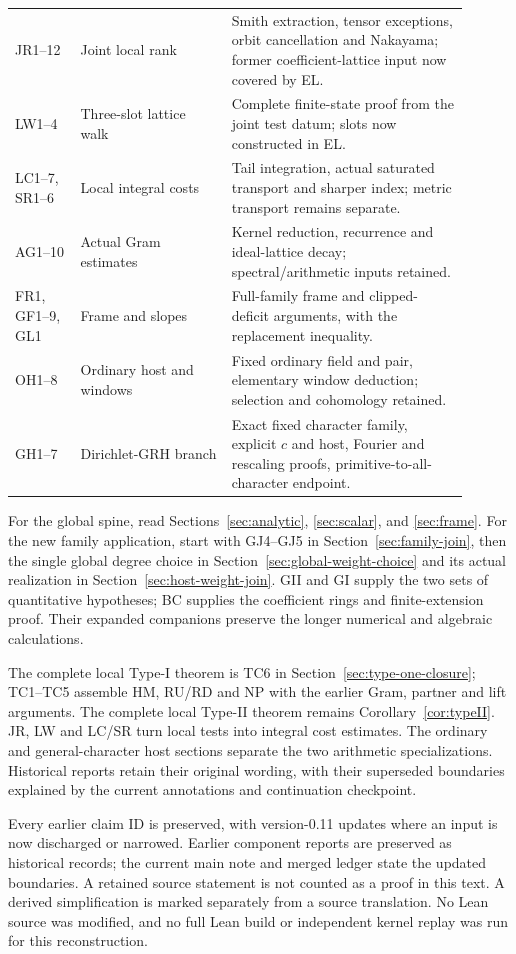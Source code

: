 \documentclass[11pt,a4paper]{article}
\numberwithin{equation}{section}
\theoremstyle{remark}\newtheorem{remark}[theorem]{Remark}
\begin{document}
\begin{longtable}{>{\raggedright\arraybackslash}p{0.13\linewidth}>{\raggedright\arraybackslash}p{0.30\linewidth}>{\raggedright\arraybackslash}p{0.47\linewidth}}
JR1--12 & Joint local rank & Smith extraction, tensor exceptions, orbit cancellation and Nakayama; former coefficient-lattice input now covered by EL.\\[3pt]
LW1--4 & Three-slot lattice walk & Complete finite-state proof from the joint test datum; slots now constructed in EL.\\[3pt]
LC1--7, SR1--6 & Local integral costs & Tail integration, actual saturated transport and sharper index; metric transport remains separate.\\[3pt]
AG1--10 & Actual Gram estimates & Kernel reduction, recurrence and ideal-lattice decay; spectral/arithmetic inputs retained.\\[3pt]
FR1, GF1--9, GL1 & Frame and slopes & Full-family frame and clipped-deficit arguments, with the replacement inequality.\\[3pt]
OH1--8 & Ordinary host and windows & Fixed ordinary field and pair, elementary window deduction; selection and cohomology retained.\\[3pt]
GH1--7 & Dirichlet-GRH branch & Exact fixed character family, explicit $c$ and host, Fourier and rescaling proofs, primitive-to-all-character endpoint.\\
\bottomrule
\end{longtable}

For the global spine, read Sections~\ref{sec:analytic},
\ref{sec:scalar}, and \ref{sec:frame}. For the new family application,
start with GJ4--GJ5 in Section~\ref{sec:family-join}, then the single
global degree choice in Section~\ref{sec:global-weight-choice} and its
actual realization in Section~\ref{sec:host-weight-join}.
GII and GI supply the two sets of quantitative hypotheses; BC supplies
the coefficient rings and finite-extension proof. Their expanded
companions preserve the longer numerical and algebraic calculations.

The complete local Type-I theorem is TC6 in
Section~\ref{sec:type-one-closure}; TC1--TC5 assemble HM, RU/RD and NP
with the earlier Gram, partner and lift arguments. The complete local
Type-II theorem remains Corollary~\ref{cor:typeII}.
JR, LW and LC/SR turn local tests into integral cost estimates.
The ordinary and general-character host sections separate the two
arithmetic specializations. Historical reports retain their original
wording, with their superseded boundaries explained by the current
annotations and continuation checkpoint.

Every earlier claim ID is preserved, with version-0.11 updates where an input is now discharged or narrowed. Earlier component reports are preserved as historical records; the current main note and merged ledger state the updated boundaries. A retained source statement is not counted as a proof in this text. A derived simplification is marked separately from a source translation. No Lean source was modified, and no full Lean build or independent kernel replay was run for this reconstruction.
\end{document}
